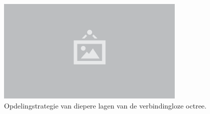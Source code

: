 \begin{figure}
  \centering
  \includegraphics[width=0.8\textwidth]{./img/raw/placeholder.png}
  \caption{Opdelingstrategie van diepere lagen van de verbindingloze octree.}
  \label{fig:vo-textures}
\end{figure}
